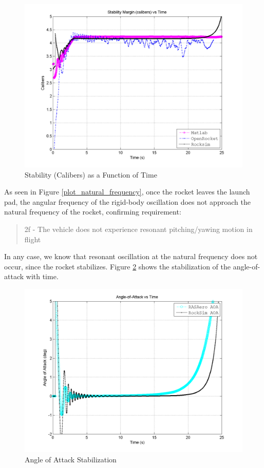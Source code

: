 \documentclass[]{article}
\begin{document}
\begin{figure}[htbp]
\centering
\includegraphics{images/plots/error_stability_calibers_plot.png}
\caption{Stability (Calibers) as a Function of Time
\label{error_stability_calibers_plot_label}}
\end{figure}

\clearpage
As seen in Figure \ref{plot_natural_frequency}, once the rocket leaves
the launch pad, the angular frequency of the rigid-body oscillation does
not approach the natural frequency of the rocket, confirming
requirement:

\begin{quote}
2f - The vehicle does not experience resonant pitching/yawing motion in
flight
\end{quote}

In any case, we know that resonant oscillation at the natural frequency
does not occur, since the rocket stabilizes. Figure
\ref{error_stability_response} shows the stabilization of the
angle-of-attack with time.

\begin{figure}[htbp]
\centering
\includegraphics{images/plots/error_aoa_plot.png}
\caption{Angle of Attack Stabilization \label{error_stability_response}}
\end{figure}
\end{document}
